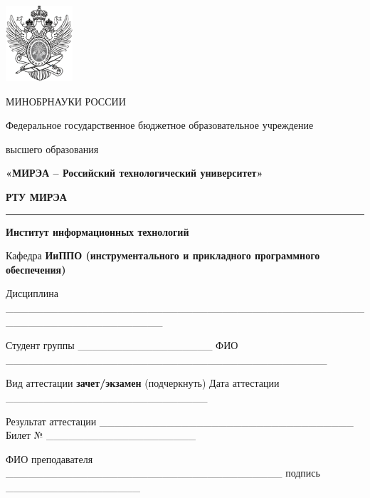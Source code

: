 \documentclass[12pt, a4paper]{extarticle}
\begin{document}
\fontsize{12pt}{1.08}\selectfont

\begin{center}
\includegraphics[width=0.97917in,height=1.10417in]{Images/mirea.png}

\setlength{\parskip}{6pt}
МИНОБРНАУКИ РОССИИ 

Федеральное государственное бюджетное образовательное учреждение
\setlength{\parskip}{0pt}

высшего образования

\textbf{«МИРЭА -- Российский технологический университет»}

\fontsize{16pt}{1.08}\selectfont
\textbf{РТУ МИРЭА}

\setlength{\parskip}{6pt}
\noindent\rule{\textwidth}{2pt}

\bigskip

\fontsize{14pt}{1.08}\selectfont
\textbf{Институт информационных технологий}

\setlength{\parskip}{0pt}
\fontsize{12pt}{1.08}\selectfont

\bigskip

\end{center}

\justifying

\setlength{\parindent}{0in}

Кафедра \textbf{ИиППО (инструментального и прикладного программного
обеспечения)}

\medskip

Дисциплина
\_\_\_\_\_\_\_\_\_\_\_\_\_\_\_\_\_\_\_\_\_\_\_\_\_\_\_\_\_\_\_\_\_\_\_\_\_\_\_\_\_\_\_\_\_\_\_\_\_\_\_\_\_\_\_\_\_\_\_\_\_\_\_\_\_\_\_\_\_

\medskip

Студент группы \_\_\_\_\_\_\_\_\_\_\_\_\_\_\_\_\_\_ ФИО
\_\_\_\_\_\_\_\_\_\_\_\_\_\_\_\_\_\_\_\_\_\_\_\_\_\_\_\_\_\_\_\_\_\_\_\_\_\_\_\_\_\_\_


\medskip

Вид аттестации \textbf{зачет/экзамен} (подчеркнуть) Дата аттестации
\_\_\_\_\_\_\_\_\_\_\_\_\_\_\_\_\_\_\_\_\_\_\_\_\_\_\_


\medskip

Результат аттестации
\_\_\_\_\_\_\_\_\_\_\_\_\_\_\_\_\_\_\_\_\_\_\_\_\_\_\_\_\_\_\_\_\_\_
Билет № \_\_\_\_\_\_\_\_\_\_\_\_\_\_\_\_\_\_\_\_


\medskip

ФИО преподавателя
\_\_\_\_\_\_\_\_\_\_\_\_\_\_\_\_\_\_\_\_\_\_\_\_\_\_\_\_\_\_\_\_\_\_\_\_\_
подпись \_\_\_\_\_\_\_\_\_\_\_\_\_\_\_\_\_\_
\end{document}
